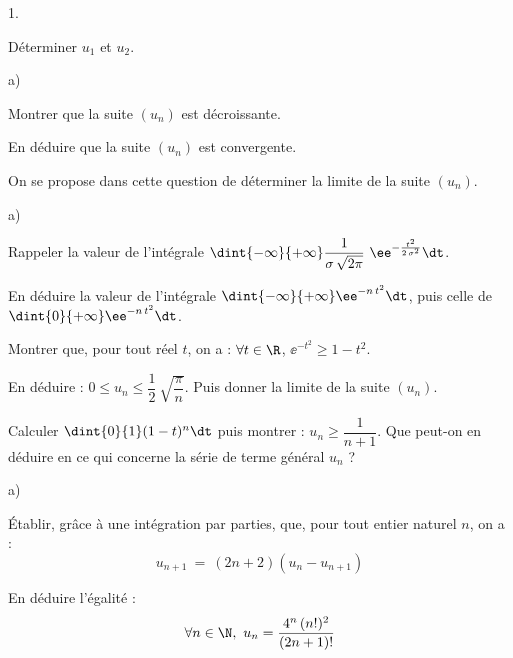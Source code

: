 \documentclass[11pt]{article}%
\begin{document}
\begin{noliste}{1.}
  \setlength{\itemsep}{4mm}
\item Déterminer $u_1$ et $u_2$.
  
\item
  \begin{noliste}{a)}
    \setlength{\itemsep}{2mm}
  \item Montrer que la suite $(u_n)$ est décroissante.
    
  \item En déduire que la suite $(u_n)$ est convergente.
  \end{noliste}
  
\item On se propose dans cette question de déterminer la limite de la
  suite $(u_n)$.
  \begin{noliste}{a)}
    \setlength{\itemsep}{2mm}
  \item Rappeler la valeur de l'intégrale $\dint{-\infty}{+\infty}
    \dfrac{1}{\sigma \, \sqrt{2 \pi}} \ \ee^{- \frac{t^2}{2 \,
        \sigma^2}} \dt$.
    
  \item En déduire la valeur de l'intégrale $\dint{-\infty}{+\infty}
    \ee^{-n \, t^2} \dt$, puis celle de $\dint{0}{+\infty} \ee^{-n \,
      t^2} \dt$.
    
  \item Montrer que, pour tout réel $t$, on a : $\forall t \in \R$,
    $\ee^{-t^2} \geq 1-t^2$.
    
  \item En déduire : $0 \leq u_n \leq \dfrac{1}{2} \
    \sqrt{\dfrac{\pi}{n}}$. Puis donner la limite de la suite $(u_n)$.
  \end{noliste}
  
\item Calculer $\dint{0}{1} (1-t)^n \dt$ puis montrer : $u_n \geq
  \dfrac{1}{n+1}$. Que peut-on en déduire en ce qui concerne la série
  de terme général $u_n$ ?
  
\item
  \begin{noliste}{a)}
    \setlength{\itemsep}{2mm}
  \item Établir, grâce à une intégration par parties, que, pour tout
    entier naturel $n$, on a :
    \[
      u_{n+1} \ = \ (2n+2)(u_n - u_{n+1})
    \]
    
  \item En déduire l'égalité :
    \[
      \forall n \in \N, \ u_n = \dfrac{4^n \, (n!)^2}{(2n+1)!}
    \]
    


\end{noliste}
\end{noliste}
\end{document}
